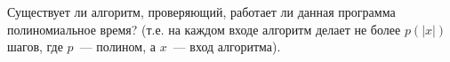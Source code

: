 Существует ли алгоритм, проверяющий, работает ли данная программа полиномиальное время? (т.е. на каждом входе алгоритм делает
не более $p(|x|)$ шагов, где $p$~--- полином, а $x$~--- вход алгоритма).